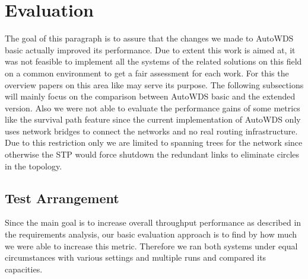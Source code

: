 \chapter{Evaluation}
The goal of this paragraph is to assure that the changes we made to AutoWDS basic actually improved its performance.
Due to extent this work is aimed at, it was not feasible to implement all the systems of the related solutions on this field on a common environment
to get a fair assessment for each work. For this the overview papers on this area like \cite{overview_caa} may serve its purpose.
The following subsections will mainly focus on the comparison between AutoWDS basic and the extended version. Also we were not able to evaluate the performance gains
of some metrics like the survival path feature since the current implementation of AutoWDS only uses network bridges to connect the networks and no real routing infrastructure.
Due to this restriction only we are limited to spanning trees for the network since otherwise the STP would force shutdown the redundant links to eliminate
circles in the topology.
\section{Test Arrangement}
Since the main goal is to increase overall throughput performance as described in the requirements analysis, our basic evaluation approach is
to find by how much we were able to increase this metric. Therefore we ran both systems under equal circumstances with various settings and multiple runs
and compared its capacities.
  \newpage
